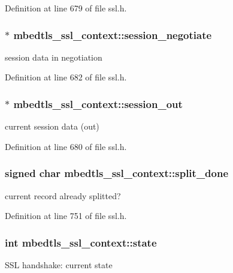 Definition at line 679 of file ssl.\-h.

\hypertarget{structmbedtls__ssl__context_a73ef7682bfa0827d71b5788c5724e718}{
\subsubsection[{session\-\_\-negotiate}]{$\ast$ mbedtls\-\_\-ssl\-\_\-context\-::session\-\_\-negotiate}}\label{structmbedtls__ssl__context_a73ef7682bfa0827d71b5788c5724e718}
session data in negotiation 

Definition at line 682 of file ssl.\-h.

\hypertarget{structmbedtls__ssl__context_a9009145707b10147eb41df26eca9629c}{
\subsubsection[{session\-\_\-out}]{$\ast$ mbedtls\-\_\-ssl\-\_\-context\-::session\-\_\-out}}\label{structmbedtls__ssl__context_a9009145707b10147eb41df26eca9629c}
current session data (out) 

Definition at line 680 of file ssl.\-h.

\hypertarget{structmbedtls__ssl__context_a0b9cdd63126690b0071c5b1821153a5a}{
\subsubsection[{split\-\_\-done}]{\setlength{\rightskip}{0pt plus 5cm}signed char mbedtls\-\_\-ssl\-\_\-context\-::split\-\_\-done}}\label{structmbedtls__ssl__context_a0b9cdd63126690b0071c5b1821153a5a}
current record already splitted? 

Definition at line 751 of file ssl.\-h.

\hypertarget{structmbedtls__ssl__context_a32cd4a2bcd224f570b5a350e277ccca3}{
\subsubsection[{state}]{\setlength{\rightskip}{0pt plus 5cm}int mbedtls\-\_\-ssl\-\_\-context\-::state}}\label{structmbedtls__ssl__context_a32cd4a2bcd224f570b5a350e277ccca3}
S\-S\-L handshake\-: current state 

